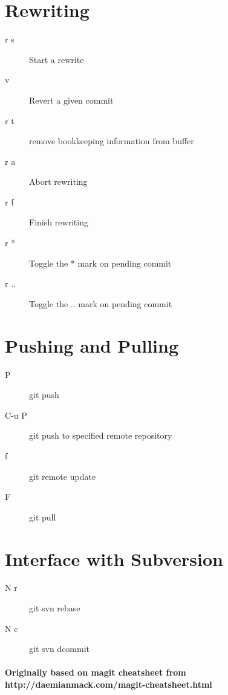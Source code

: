 \documentclass[11pt,a4paper]{article}
\begin{document}
\begin{multicols}{2}
\section{Rewriting}
\begin{description}
\item[r s] Start a rewrite
\item[v] Revert a given commit
\item[r t] remove bookkeeping information from buffer
\item[r a] Abort rewriting
\item[r f] Finish rewriting
\item[r *] Toggle the * mark on pending commit
\item[r ..] Toggle the .. mark on pending commit
\end{description}

\section{Pushing and Pulling}
\begin{description}
\item[P] git push
\item[C-u P] git push to specified remote repository
\item[f] git remote update
\item[F] git pull
\end{description}

\section{Interface with Subversion}
\begin{description}
\item[N r] git svn rebase
\item[N c] git svn dcommit
\end{description}

\end{multicols}

\paragraph{Originally based on magit cheatsheet from
  http://daemianmack.com/magit-cheatsheet.html} %
\end{document}
